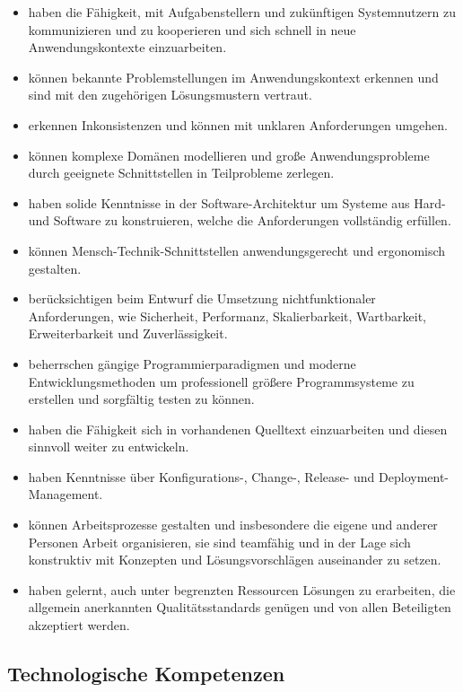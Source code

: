 \begin{itemize}
\tightlist
\item
  haben die Fähigkeit, mit Aufgabenstellern und zukünftigen
  Systemnutzern zu kommunizieren und zu kooperieren und sich schnell in
  neue Anwendungskontexte einzuarbeiten.
\item
  können bekannte Problemstellungen im Anwendungskontext erkennen und
  sind mit den zugehörigen Lösungsmustern vertraut.
\item
  erkennen Inkonsistenzen und können mit unklaren Anforderungen umgehen.
\item
  können komplexe Domänen modellieren und große Anwendungsprobleme durch
  geeignete Schnittstellen in Teilprobleme zerlegen.
\item
  haben solide Kenntnisse in der Software-Architektur um Systeme aus
  Hard- und Software zu konstruieren, welche die Anforderungen
  vollständig erfüllen.
\item
  können Mensch-Technik-Schnittstellen anwendungsgerecht und ergonomisch
  gestalten.
\item
  berücksichtigen beim Entwurf die Umsetzung nichtfunktionaler
  Anforderungen, wie Sicherheit, Performanz, Skalierbarkeit,
  Wartbarkeit, Erweiterbarkeit und Zuverlässigkeit.
\item
  beherrschen gängige Programmierparadigmen und moderne
  Entwicklungsmethoden um professionell größere Programmsysteme zu
  erstellen und sorgfältig testen zu können.
\item
  haben die Fähigkeit sich in vorhandenen Quelltext einzuarbeiten und
  diesen sinnvoll weiter zu entwickeln.
\item
  haben Kenntnisse über Konfigurations-, Change-, Release- und
  Deployment-Management.
\item
  können Arbeitsprozesse gestalten und insbesondere die eigene und
  anderer Personen Arbeit organisieren, sie sind teamfähig und in der
  Lage sich konstruktiv mit Konzepten und Lösungsvorschlägen auseinander
  zu setzen.
\item
  haben gelernt, auch unter begrenzten Ressourcen Lösungen zu
  erarbeiten, die allgemein anerkannten Qualitätsstandards genügen und
  von allen Beteiligten akzeptiert werden.
\end{itemize}

\subsection{Technologische
Kompetenzen}\label{technologische-kompetenzen}

